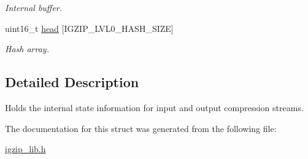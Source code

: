 \begin{DoxyCompactItemize}
\begin{DoxyCompactList}\small\item\em Internal buffer. \end{DoxyCompactList}\item 
\hypertarget{structisal__zstate_aea49aef5075c1852f2f4197f0d9b8809}{uint16\-\_\-t \hyperlink{structisal__zstate_aea49aef5075c1852f2f4197f0d9b8809}{head} \mbox{[}I\-G\-Z\-I\-P\-\_\-\-L\-V\-L0\-\_\-\-H\-A\-S\-H\-\_\-\-S\-I\-Z\-E\mbox{]}}\label{structisal__zstate_aea49aef5075c1852f2f4197f0d9b8809}

\begin{DoxyCompactList}\small\item\em Hash array. \end{DoxyCompactList}\end{DoxyCompactItemize}


\subsection{Detailed Description}
Holds the internal state information for input and output compression streams. 

The documentation for this struct was generated from the following file\-:\begin{DoxyCompactItemize}
\item 
\hyperlink{igzip__lib_8h}{igzip\-\_\-lib.\-h}\end{DoxyCompactItemize}
